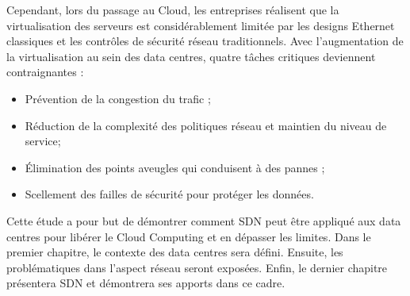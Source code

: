 \par
Cependant, lors du passage au Cloud, les entreprises réalisent que la virtualisation des serveurs est considérablement limitée par les designs Ethernet classiques et les contrôles de sécurité réseau traditionnels. Avec l'augmentation de la virtualisation au sein des data centres, quatre tâches critiques deviennent contraignantes :
\begin{itemize}
\item Prévention de la congestion du trafic ;
\item Réduction de la complexité des politiques réseau et maintien du niveau de service;
\item Élimination des points aveugles qui conduisent à des pannes ;
\item  Scellement des failles de sécurité pour protéger les données. \cite{virtualizedCCCC}\\
\end{itemize}

\par
Cette étude a pour but de démontrer comment SDN peut être appliqué aux data centres pour libérer le Cloud Computing et en dépasser les limites. Dans le premier chapitre, le contexte des data centres sera défini. Ensuite, les problématiques dans l'aspect réseau seront exposées. Enfin, le dernier chapitre présentera SDN et démontrera ses apports dans ce cadre.

